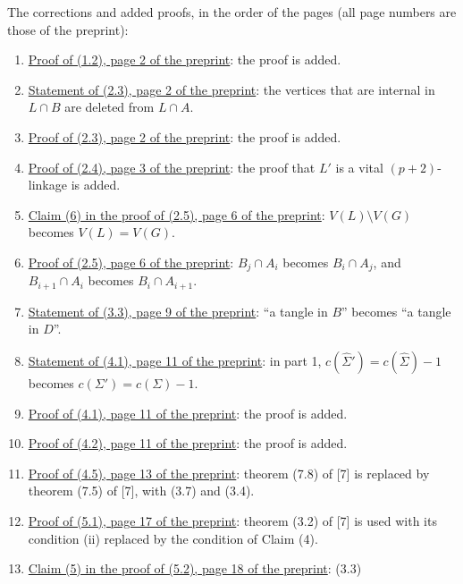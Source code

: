 The corrections and added proofs, in the order of the pages (all page numbers are those of the preprint):
\begin{enumerate}\setlength{\itemsep}{1pt}
\item {}\hyperref[fix:1.2-proof-added]{Proof of (1.2), page 2 of the preprint}: the proof is added.
\item {}\hyperref[fix:2.3]{Statement of (2.3), page 2 of the preprint}: the vertices that are
internal in $L \cap B$ are deleted from $L \cap A$.
\item {}\hyperref[fix:2.3-proof-added]{Proof of (2.3), page 2 of the preprint}: the proof is added.
\item {}\hyperref[fix:2.4-proof-added]{Proof of (2.4), page 3 of the preprint}: the proof that $L'$ is a vital $(p+2)$-linkage is added.
\item {}\hyperref[fix:2.5-claim6]{Claim (6) in the proof of (2.5), page 6 of the preprint}:
$V(L) \setminus V(G)$ becomes $V(L) = V(G)$.
\item {}\hyperref[fix:2.5-end]{Proof of (2.5), page 6 of the preprint}: $B_j \cap A_i$ becomes
$B_i \cap A_j$, and $B_{i+1} \cap A_i$ becomes $B_i \cap A_{i+1}$.
\item {}\hyperref[fix:3.3]{Statement of (3.3), page 9 of the preprint}: ``a tangle in $B$'' becomes
``a tangle in $D$''.
\item {}\hyperref[fix:4.1]{Statement of (4.1), page 11 of the preprint}: in part 1,
$c(\hat{\Sigma}') = c(\hat{\Sigma}) - 1$ becomes $c(\Sigma') = c(\Sigma) - 1$.
\item {}\hyperref[fix:4.1-proof-added]{Proof of (4.1), page 11 of the preprint}: the proof is added.
\item {}\hyperref[fix:4.2-proof-added]{Proof of (4.2), page 11 of the preprint}: the proof is added.
\item {}\hyperref[fix:4.5-proof]{Proof of (4.5), page 13 of the preprint}: theorem (7.8) of [7] is
replaced by theorem (7.5) of [7], with (3.7) and (3.4).
\item {}\hyperref[fix:5.1-proof]{Proof of (5.1), page 17 of the preprint}: theorem (3.2) of [7] is
used with its condition (ii) replaced by the condition of Claim (4).
\item {}\hyperref[fix:5.2-claim5]{Claim (5) in the proof of (5.2), page 18 of the preprint}: (3.3)

\end{enumerate}
